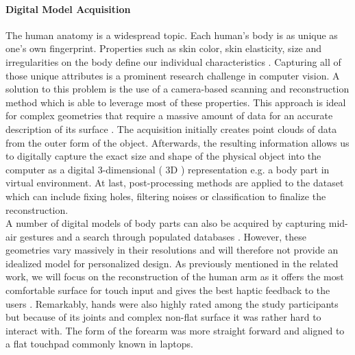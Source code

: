 \paragraph*{Digital Model Acquisition} The human anatomy is a widespread topic. 
Each human's body is as unique as one's own fingerprint. Properties such as skin color, skin elasticity, size and irregularities on the body define our individual characteristics \cite{Nittala:2018:MST:3173574.3173607}. Capturing all of those unique attributes is a prominent research challenge in computer vision. A solution to this problem is the use of a camera-based scanning and reconstruction method which is able to leverage most of these properties. This approach is ideal for complex geometries that require a massive amount of data for an accurate description of its surface \cite{Gopi:2002:FEP:646016.678279}. The acquisition initially creates point clouds of data from the outer form of the object. Afterwards, the resulting information allows us to digitally capture the exact size and shape of the physical object into the computer as a digital 3-dimensional ( 3D ) representation e.g. a body part in virtual environment. At last, post-processing methods are applied to the dataset which can include fixing holes, filtering noises or classification \cite{Weyrich:2004:PSS:2386332.2386347} to finalize the reconstruction.\\
A number of digital models of body parts can also be acquired by capturing mid-air gestures and a search through populated databases \cite{Holz:2011:DMI:1978942.1979060}. However, these geometries vary massively in their resolutions and will therefore not provide an idealized model for personalized design.
\newpara
As previously mentioned in the related work, we will focus on the reconstruction of the human arm as it offers the most comfortable surface for touch input and gives the best haptic feedback to the users \cite{Harrison:2014:ILT:2598510.2598587, Weigel:2014:MTU:2556288.2557239}. Remarkably, hands were also highly rated among the study participants but because of its joints and complex non-flat surface it was rather hard to interact with. The form of the forearm was more straight forward and aligned to a flat touchpad commonly known in laptops.
